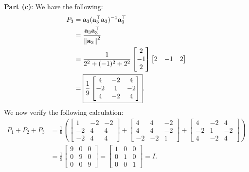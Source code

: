 \documentclass[11pt]{article}
\renewcommand{\vec}[1]{\mathbf{#1}}
\begin{document}
\textbf{Part (c)}: We have the following:
\begin{align*}
	P_{3} &= \vec{a}_{3} (\vec{a}_{3}^{\top}\vec{a}_{3})^{-1}\vec{a}_{3}^{\top} \\
	&= \frac{\vec{a}_{3}\vec{a}_{3}^{\top}}{\norm{\vec{a}_{3}}^{2}} \\
	&= \frac{1}{2^{2} + (-1)^{2} + 2^{2}} \begin{bmatrix} 2 \\ -1 \\ 2 \end{bmatrix} \begin{bmatrix} 2 & -1 & 2 \end{bmatrix} \\
	&= \boxed{\frac{1}{9} \begin{bmatrix} 4 & -2 & 4 \\ -2 & 1 & -2 \\ 4 & -2 & 4 \end{bmatrix}}.
\end{align*}
We now verify the following calculation:
\begin{align*}
	P_{1} + P_{2} + P_{3} &= \frac{1}{9} \left( \begin{bmatrix} 1 & -2 & -2 \\ -2 & 4 & 4 \\ -2 & 4 & 4 \end{bmatrix} + \begin{bmatrix} 4 & 4 & -2 \\ 4 & 4 & -2 \\ -2 & -2 & 1 \end{bmatrix} + \begin{bmatrix} 4 & -2 & 4 \\ -2 & 1 & -2 \\ 4 & -2 & 4 \end{bmatrix} \right) \\
	&= \frac{1}{9} \begin{bmatrix} 9 & 0 & 0 \\ 0 & 9 & 0 \\ 0 & 0 & 9 \end{bmatrix} = \begin{bmatrix} 1 & 0 & 0 \\ 0 & 1 & 0 \\ 0 & 0 & 1 \end{bmatrix} = I.
\end{align*}

\end{document}
